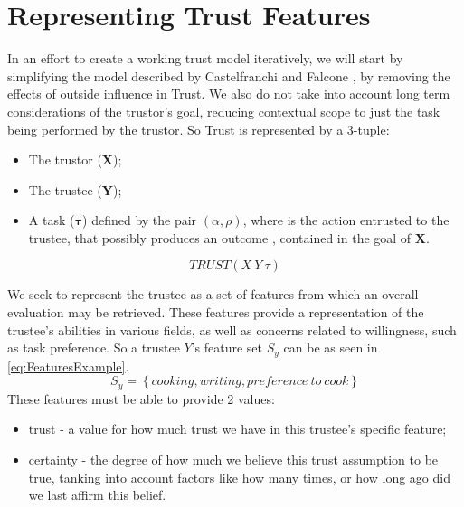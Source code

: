
\section{Representing Trust Features}
\label{sec:RepresentingTrustFeatures}




In an effort to create a working trust model iteratively, we will start by simplifying the model described by Castelfranchi and Falcone \cite{Castelfranchi1998}, by removing the effects of outside influence in Trust. We also do not take into account long term considerations of the trustor's goal, reducing contextual scope to just the task being performed by the trustor. So Trust is represented by a 3-tuple:

\begin{itemize}
	\item The trustor (\textbf{X});
	\item The trustee (\textbf{Y});
	\item A task ($\bm{\tau}$) defined by the pair $(\alpha, \rho)$, where \bm{$\alpha$} is the action entrusted to the trustee, that possibly produces an outcome \bm{$\rho$}, contained in the goal of \textbf{X}.
\end{itemize}
\begin{equation}
TRUST(X\ Y\ \tau)
\label{eq:TrustRelation}
\end{equation}

We seek to represent the trustee as a set of features from which an overall evaluation may be retrieved. These features provide a representation of the trustee's abilities in various fields, as well as concerns related to willingness, such as task preference. So a trustee $Y$'s feature set $ S_y $ can be as seen in \ref{eq:FeaturesExample}.
\begin{equation}
S_y=\left\{cooking, writing, preference\ to\ cook\right\}
\label{eq:FeaturesExample}
\end{equation}
These features must be able to provide 2 values:

\begin{itemize}
	\item trust - a value for how much trust we have in this trustee's specific feature;
	\item certainty - the degree of how much we believe this trust assumption to be true, tanking into account factors like how many times, or how long ago did we last affirm this belief.
\end{itemize}

